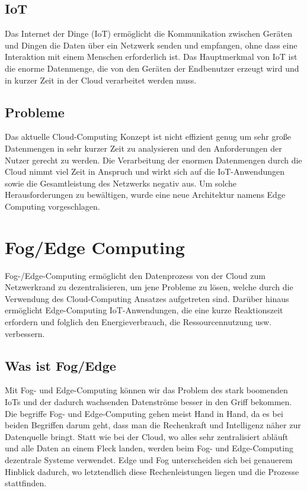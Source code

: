 \documentclass[conference]{IEEEtran}
\begin{document}
\subsection{IoT}
Das Internet der Dinge (IoT) ermöglicht die Kommunikation zwischen Geräten und Dingen die Daten über ein Netzwerk senden und empfangen, ohne dass eine Interaktion mit einem Menschen erforderlich ist. Das Hauptmerkmal von IoT ist die enorme Datenmenge, die von den Geräten der Endbenutzer erzeugt wird und in kurzer Zeit in der Cloud verarbeitet werden muss.


\subsection{Probleme}
Das aktuelle Cloud-Computing Konzept ist nicht effizient genug um sehr große Datenmengen in sehr kurzer Zeit zu analysieren und den Anforderungen der Nutzer gerecht zu werden. Die Verarbeitung der enormen Datenmengen durch die Cloud nimmt viel Zeit in Anspruch und wirkt sich auf die IoT-Anwendungen sowie die Gesamtleistung des Netzwerks negativ aus. Um solche Herausforderungen zu bewältigen, wurde eine neue Architektur namens Edge Computing vorgeschlagen. 

\section{Fog/Edge Computing}


Fog-/Edge-Computing ermöglicht den Datenprozess von der Cloud zum Netzwerkrand zu dezentralisieren, um jene Probleme zu lösen, welche durch die Verwendung des Cloud-Computing Ansatzes aufgetreten sind. Darüber hinaus ermöglicht Edge-Computing IoT-Anwendungen, die eine kurze Reaktionszeit erfordern und folglich den Energieverbrauch, die Ressourcennutzung usw. verbessern.

\subsection{Was ist Fog/Edge}
Mit Fog- und Edge-Computing können wir das Problem des stark boomenden IoTs und der dadurch wachsenden Datenströme besser in den Griff bekommen. 
Die begriffe Fog- und Edge-Computing gehen meist Hand in Hand, da es bei beiden Begriffen darum geht, dass man die Rechenkraft und Intelligenz näher zur Datenquelle bringt. Statt wie bei der Cloud, wo alles sehr zentralisiert abläuft und alle Daten an einem Fleck landen, werden beim Fog- und Edge-Computing dezentrale Systeme verwendet. Edge und Fog unterscheiden sich bei genauerem Hinblick dadurch, wo letztendlich diese Rechenleistungen liegen und die Prozesse stattfinden. 
\end{document}
